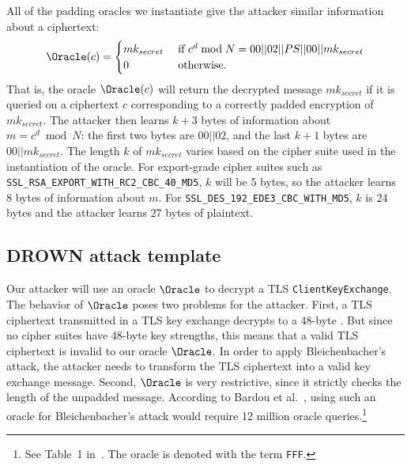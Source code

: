 All of the \ssltwo padding oracles we instantiate give the attacker similar information about a \PKCSconform \ssltwo ciphertext:
\begin{equation*} 
\Oracle(c) =  
\begin{cases} 
mk_{secret} & \text{ if } c^d \bmod N = 00 || 02 || PS || 00 || mk_{secret}  \\ 
0 & \text{ otherwise.} 
\end{cases} 
\end{equation*}
That is, the oracle $\Oracle(c)$ will return the decrypted message $mk_{secret}$ if it is queried on a \PKCSconform \ssltwo ciphertext $c$ corresponding to a correctly \PKCS padded encryption of $mk_{secret}$.  The attacker then learns $k + 3$ bytes of information about $m = c^d \bmod N$: the first two bytes are $00 || 02$, and the last $k+1$ bytes are $00 || mk_{secret}$.  The length $k$ of $mk_{secret}$ varies based on the cipher suite used in the instantiation of the oracle.  For export-grade cipher suites such as \texttt{SSL\_RSA\_EXPORT\_WITH\_RC2\_CBC\_40\_MD5},
$k$ will be 5 bytes, so the attacker learns 8 bytes of information about $m$. For 
\texttt{SSL\_DES\_192\_EDE3\_CBC\_WITH\_MD5}\@, $k$ is 24 bytes and the attacker learns 27 bytes of plaintext.

\subsection{DROWN attack template}
\label{sec:adapted-bb-compact}
Our attacker will use an \ssltwo oracle $\Oracle$ to decrypt a TLS \texttt{ClientKeyExchange}.  
The behavior of $\Oracle$ poses two problems for the attacker. First, a TLS ciphertext transmitted in a TLS key exchange decrypts to a 48-byte \pms. But since no \ssltwo cipher suites have 48-byte key strengths, this means that a valid TLS ciphertext is invalid to our oracle $\Oracle$. 
In order to apply Bleichenbacher's attack, the attacker needs to transform the TLS ciphertext into a valid \ssltwo key exchange message. Second, $\Oracle$ is very restrictive, since it strictly checks the length of the unpadded message. 
According to Bardou et al.~\cite{bardou2012efficient}, using such an oracle for Bleichenbacher's attack would require 12 million oracle queries.\footnote{See Table~1 in~\cite{bardou2012efficient}. The oracle is denoted with the term \texttt{FFF}.} 


